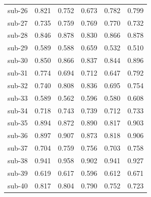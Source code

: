 \begin{table}[t]
\begin{tabular}{lccccc}
sub-26 & 0.821 & 0.752 & 0.673 & 0.782 & 0.799 \\
sub-27 & 0.735 & 0.759 & 0.769 & 0.770 & 0.732 \\
sub-28 & 0.846 & 0.878 & 0.830 & 0.866 & 0.878 \\
sub-29 & 0.589 & 0.588 & 0.659 & 0.532 & 0.510 \\
sub-30 & 0.850 & 0.866 & 0.837 & 0.844 & 0.896 \\
sub-31 & 0.774 & 0.694 & 0.712 & 0.647 & 0.792 \\
sub-32 & 0.740 & 0.808 & 0.836 & 0.695 & 0.754 \\
sub-33 & 0.589 & 0.562 & 0.596 & 0.580 & 0.608 \\
sub-34 & 0.718 & 0.743 & 0.739 & 0.712 & 0.733 \\
sub-35 & 0.894 & 0.872 & 0.890 & 0.817 & 0.903 \\
sub-36 & 0.897 & 0.907 & 0.873 & 0.818 & 0.906 \\
sub-37 & 0.704 & 0.759 & 0.756 & 0.703 & 0.758 \\
sub-38 & 0.941 & 0.958 & 0.902 & 0.941 & 0.927 \\
sub-39 & 0.619 & 0.617 & 0.596 & 0.612 & 0.671 \\
sub-40 & 0.817 & 0.804 & 0.790 & 0.752 & 0.723 \\
\bottomrule
\end{tabular}
\end{table}

